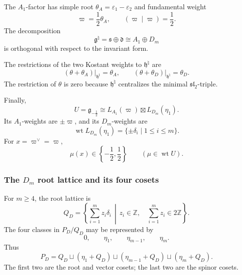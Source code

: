 \documentclass[11pt,reqno]{amsart}
\theoremstyle{definition}
\theoremstyle{remark}
\begin{document}
The \(A_1\)-factor has simple root
\(\theta_A=\varepsilon_1-\varepsilon_2\) and fundamental weight
\begin{equation*}
  \varpi=\frac12\theta_A,
  \qquad
  (\varpi\mid\varpi)=\frac12.
\end{equation*}
The decomposition
\[
  \mathfrak g^\natural
  =
  \mathfrak s\oplus\mathfrak d
  \cong
  A_1\oplus D_m
\]
is orthogonal with respect to the invariant form.

The restrictions of the two Kostant weights to
\(\mathfrak h^\natural\) are
\begin{equation*}
  (\theta+\theta_A)\big|_{\mathfrak h^\natural}
  =
  \theta_A,
  \qquad
  (\theta+\theta_D)\big|_{\mathfrak h^\natural}
  =
  \theta_D.
\end{equation*}
The restriction of \(\theta\) is zero because
\(\mathfrak h^\natural\) centralizes the minimal
\(\mathfrak{sl}_2\)-triple.

Finally,
\begin{equation*}
  U=\mathfrak g_{-\frac12}
  \cong
  L_{A_1}(\varpi)
  \boxtimes
  L_{D_m}(\eta_1).
\end{equation*}
Its \(A_1\)-weights are \(\pm\varpi\), and its \(D_m\)-weights are
\begin{equation*}
  \operatorname{wt}L_{D_m}(\eta_1)
  =
  \{\pm\delta_i\mid1\le i\le m\}.
\end{equation*}
For \(x=\varpi^\vee=\varpi\),
\begin{equation*}
  \mu(x)\in
  \left\{
    -\frac12,\frac12
  \right\}
  \qquad
  (\mu\in\operatorname{wt}U).
\end{equation*}

\subsubsection{The \(D_m\) root lattice and its four cosets}


For \(m\ge4\), the root lattice is
\begin{equation*}
  Q_D
  =
  \left\{
    \sum_{i=1}^{m}z_i\delta_i
    \,\middle|\,
    z_i\in\mathbb Z,\quad
    \sum_{i=1}^{m}z_i\in2\mathbb Z
  \right\}.
\end{equation*}
The four classes in \(P_D/Q_D\) may be represented by
\begin{equation*}
  0,
  \qquad
  \eta_1,
  \qquad
  \eta_{m-1},
  \qquad
  \eta_m.
\end{equation*}
Thus
\begin{equation*}
  P_D
  =
  Q_D
  \sqcup
  (\eta_1+Q_D)
  \sqcup
  (\eta_{m-1}+Q_D)
  \sqcup
  (\eta_m+Q_D).
\end{equation*}
The first two are the root and vector cosets; the last two are the
spinor cosets.
\end{document}
